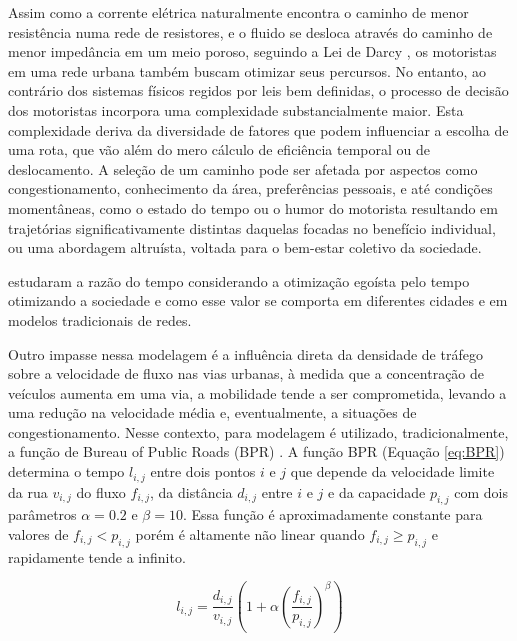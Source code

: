 \documentclass{article}
\begin{document}

Assim como a corrente elétrica naturalmente encontra o caminho de menor resistência numa rede de resistores, e o fluido se desloca através do caminho de menor impedância em um meio poroso, seguindo a Lei de Darcy \citep{darcy}, os motoristas em uma rede urbana também buscam otimizar seus percursos. No entanto, ao contrário dos sistemas físicos regidos por leis bem definidas, o processo de decisão dos motoristas incorpora uma complexidade substancialmente maior. Esta complexidade deriva da diversidade de fatores que podem influenciar a escolha de uma rota, que vão além do mero cálculo de eficiência temporal ou de deslocamento. A seleção de um caminho pode ser afetada por aspectos como congestionamento, conhecimento da área, preferências pessoais, e até condições momentâneas, como o estado do tempo ou o humor do motorista resultando em trajetórias significativamente distintas daquelas focadas no benefício individual, ou uma abordagem altruísta, voltada para o bem-estar coletivo da sociedade. 

\citet{Anarchy} estudaram a razão do tempo considerando a otimização egoísta pelo tempo otimizando a sociedade e como esse valor se comporta em diferentes cidades e em modelos tradicionais de redes. 


Outro impasse nessa modelagem é a influência direta da densidade de tráfego sobre a velocidade de fluxo nas vias urbanas, à medida que a concentração de veículos aumenta em uma via, a mobilidade tende a ser comprometida, levando a uma redução na velocidade média e, eventualmente, a situações de congestionamento. Nesse contexto, para modelagem é utilizado, tradicionalmente, a função de Bureau of Public Roads (BPR) \citep{Dial2006,Anarchy,Ambhl2023}. A função BPR (Equação \ref{eq:BPR}) determina o tempo $l_{i,j}$ entre dois pontos $i$ e $j$ que depende da velocidade limite da rua $v_{i,j}$ do fluxo $f_{i,j}$, da distância $d_{i,j}$ entre $i$ e $j$ e da capacidade $p_{i,j}$ com dois parâmetros $\alpha = 0.2$ e $\beta = 10 $\citep{Anarchy}. Essa função é aproximadamente constante para valores de $f_{i,j} < p_{i,j}$ porém é altamente não linear quando $f_{i,j} \geq p_{i,j}$ e rapidamente tende a infinito.

\begin{equation}
    l_{i,j} = \frac{d_{i,j}}{v_{i,j}}\left(1 + \alpha\left(\frac{f_{i,j}}{p_{i,j}}\right)^{\beta} \right)
    \label{eq:BPR}
\end{equation}
\end{document}
